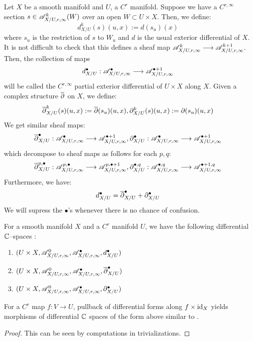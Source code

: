 \documentclass[11pt]{amsart}
\begin{document}
\begin{defn}\label{defn:prt-diff}
Let $X$ be a smooth manifold and $U$, a $C^r$ manifold.
Suppose we have a $C^{r, \infty}$ section $s \in \mathscr{A}^k_{X/U, r, \infty}(W)$ over an open
$W \subset U \times X$.
Then, we define:
\[
d_{X/U}^k(s)(u, x) := d(s_u)(x)
\]
where $s_u$ is the restriction of $s$ to $W_u$ and $d$ is the usual exterior
differential of $X$.
It is not difficult to check that this defines a sheaf map
$\sA^k_{X/U, r, \infty} \to \sA^{k + 1}_{X/U, r, \infty}$.
Then, the collection of maps
\[
d_{X/U}^\bullet : \sA^\bullet_{X/U, r, \infty} \to \sA^{\bullet + 1}_{X/U, r, \infty}
\]
will be called the $C^{r, \infty}$ partial exterior differential of $U \times X$ along $X$.
Given a complex structure $\overline{\partial}$ on $X$, we define:
\[
\overline{\partial}^k_{X/U}(s)(u, x) := \overline{\partial}(s_u)(u, x), \partial^k_{X/U}(s)(u, x) := \partial(s_u)(u, x)
\]
We get similar sheaf maps:
\[
\oprt_{X/U}^{\bullet} : \sA^{\bullet}_{X/U, r, \infty}
    \to \sA^{\bullet + 1}_{X/U, r, \infty},
\prt_{X/U}^{\bullet} : \sA^{\bullet}_{X/U, r, \infty}
    \to \sA^{\bullet + 1}_{X/U, r, \infty}
\]
which decompose to sheaf maps as follows for each $p, q$:
\[
\oprt_{X/U}^{p, \bullet} : \sA^{p, \bullet}_{X/U, r, \infty}
    \to \sA^{p, \bullet + 1}_{X/U, r, \infty},
\prt_{X/U}^{\bullet, q} : \sA^{\bullet, q}_{X/U, r, \infty}
    \to \sA^{\bullet + 1, q}_{X/U, r, \infty}
\]
Furthermore, we have:
\[
d^\bullet_{X/U} = \overline{\partial}_{X/U}^{\bullet} + \partial_{X/U}^{\bullet}
\]
We will supress the $\bullet$'s whenever there is no chance of confusion.
\end{defn}

\begin{cor}
For a smooth manifold $X$ and a $C^r$ manifold $U$, we have the following differential
$\mathbb{C}$--spaces \cite[Definition 2.2.1]{AR26a}:
\begin{enumerate}
\item
$(U \times X, \mathscr{A}^0_{X/U, r, \infty}, \mathscr{A}^\bullet_{X/U, r, \infty}, d_{X/U}^\bullet)$
\item
$(U \times X, \mathscr{A}^0_{X/U, r, \infty}, \mathscr{A}^\bullet_{X/U, r, \infty}, \overline{\partial}_{X/U}^\bullet)$
\item
$(U \times X, \mathscr{A}^0_{X/U, r, \infty}, \mathscr{A}^\bullet_{X/U, r, \infty}, \partial_{X/U}^\bullet)$
\end{enumerate}
For a $C^r$ map $f : V \to U$, pullback of differential forms along $f \times \mathrm{id}_X$ yields
morphisms of differential $\mathbb{C}$ spaces of the form above similar to \cite[\S 2]{AR26a}.
\end{cor}
\begin{proof}
This can be seen by computations in trivializations.
\end{proof}
\end{document}
